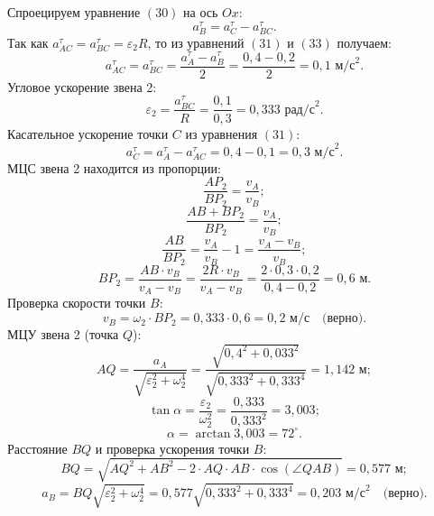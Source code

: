 \documentclass{article}
\begin{document}
\medskip
Спроецируем уравнение $(30)$ на ось $Ox$:
\begin{equation}
    {a}_B^\tau = {a}_C^\tau - {a}_{BC}^\tau.
\end{equation}
Так как ${a}_{AC}^\tau = {a}_{BC}^\tau =\varepsilon_2R$, то из уравнений $(31)$ и $(33)$ получаем:
\begin{equation}
a_{AC}^\tau = a_{BC}^\tau = \frac{a_A^\tau - a_B^\tau}{2} = \frac{0,4 - 0,2}{2} = 0,1 \text{ м/с}^2.
\end{equation}
\medskip
Угловое ускорение звена 2:
\begin{equation}
\varepsilon_2 = \frac{a_{BC}^\tau}{R} = \frac{0,1}{0,3} = 0,333 \text{ рад/с}^2.
\end{equation}
\medskip
Касательное ускорение точки $C$ из уравнения $(31)$:
\begin{equation}
a_C^\tau = a_A^\tau - a_{AC}^\tau = 0,4 - 0,1 = 0,3 \text{ м/с}^2.
\end{equation}
\medskip
МЦС звена 2 находится из пропорции:
\begin{equation}
    \frac{AP_2}{BP_2} = \frac{v_A}{v_B};
\end{equation}
\begin{equation}
    \frac{AB+BP_2}{BP_2} = \frac{v_A}{v_B};
\end{equation}
\begin{equation}
    \frac{AB}{BP_2} = \frac{v_A}{v_B} - 1 = \frac{v_A-v_B}{v_B};
\end{equation}
\begin{equation}
    BP_2 = \frac{AB \cdot v_B}{v_A-v_B} = \frac{2R \cdot v_B}{v_A-v_B} = \frac{2 \cdot 0,3 \cdot 0,2}{0,4-0,2} = 0,6 \text{ м}.
\end{equation}
\medskip
Проверка скорости точки $B$:
\begin{equation}
v_B = \omega_2 \cdot BP_2 = 0,333\cdot 0,6 = 0,2 \text{ м/с} \quad \text{(верно)}.
\end{equation}
\medskip
МЦУ звена 2 (точка $Q$):
\begin{equation}
AQ = \frac{a_A}{\sqrt{\varepsilon_2^2 + \omega_2^4}} = \frac{\sqrt{0,4^2 + 0,033^2}}{\sqrt{0,333^2 + 0,333^4}} = 1,142 \text{ м};
\end{equation}
\begin{equation}
\tan \alpha = \frac{\varepsilon_2}{\omega_2^2} = \frac{0,333}{0,333^2}=3,003;
\end{equation}
\begin{equation}
    \alpha = \arctan 3,003 = 72^\circ.
\end{equation}
Расстояние $BQ$ и проверка ускорения точки $B$:
\begin{equation}
BQ = \sqrt{AQ^2 + AB^2 - 2 \cdot AQ \cdot AB \cdot \cos(\angle QAB)} = 0,577 \text{ м};
\end{equation}
\begin{equation}
a_B = BQ \sqrt{\varepsilon_2^2 + \omega_2^4} = 0,577 \sqrt{0,333^2 + 0,333^4} = 0,203 \text{ м/с}^2 \quad \text{(верно)}.
\end{equation}
\end{document}
